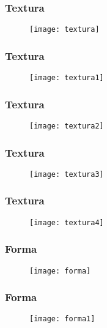 \documentclass[14pt]{beamer}
\begin{document}
 \begin{frame}
\frametitle{Textura}
 \begin{figure}
    \centering
    \texttt{[image: textura]}
  \end{figure}
\end{frame}
 \begin{frame}
\frametitle{Textura}
 \begin{figure}
    \centering
    \texttt{[image: textura1]}
  \end{figure}
\end{frame}
 \begin{frame}
\frametitle{Textura}
 \begin{figure}
    \centering
    \texttt{[image: textura2]}
  \end{figure}
\end{frame}
 \begin{frame}
\frametitle{Textura}
 \begin{figure}
    \centering
    \texttt{[image: textura3]}
  \end{figure}
\end{frame}
 \begin{frame}
\frametitle{Textura}
 \begin{figure}
    \centering
    \texttt{[image: textura4]}
  \end{figure}
\end{frame}
 \begin{frame}
\frametitle{Forma}
 \begin{figure}
    \centering
    \texttt{[image: forma]}
  \end{figure}
\end{frame}
 \begin{frame}
\frametitle{Forma}
 \begin{figure}
    \centering
    \texttt{[image: forma1]}
  \end{figure}
\end{frame}
\end{document}
